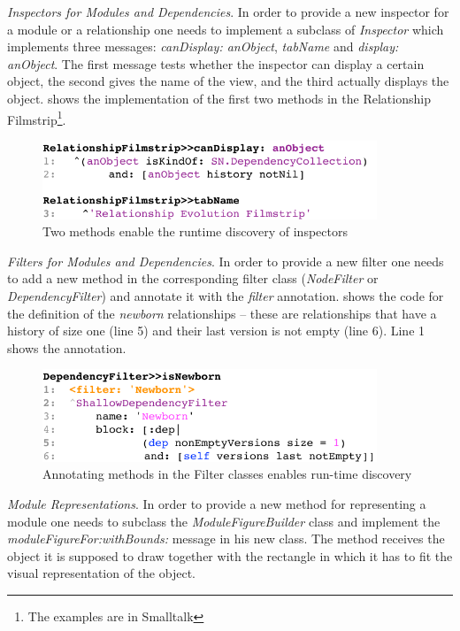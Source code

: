 \documentclass[preprint,12pt]{elsarticle}
\newcommand{\cd}[1]{{\em{#1}}}
\begin{document}
\begin{description}
\item {\em Inspectors for Modules and Dependencies}. In order to provide a new inspector for a module or a relationship one needs to implement a subclass of {\em Inspector} which implements three messages: \cd{canDisplay: anObject}, \cd{tabName} and \cd{display: anObject}. The first message tests whether the inspector can display a certain object, the second gives the name of the view, and the third actually displays the object.  shows the implementation of the first two methods in the Relationship Filmstrip\footnote{The examples are in Smalltalk}.

\begin{figure}[h]
\begin{center}
\includegraphics[width=10cm]{filmstrip-sample}
\caption{Two methods enable the runtime discovery of inspectors}
\end{center}
\end{figure}

\item {\em Filters for Modules and Dependencies}. In order to provide a new filter one needs to add a new method in the corresponding filter class (\cd{NodeFilter} or \cd{DependencyFilter}) and annotate it with the \cd{filter} annotation.  shows the code for the definition of the {\em newborn} relationships -- these are relationships that have a history of size one (line 5) and their last version is not empty (line 6). Line 1 shows the annotation.

\begin{figure}[h]
\begin{center}
\includegraphics[width=10cm]{filter-sample}
\caption{Annotating methods in the Filter classes enables run-time discovery}
\end{center}
\end{figure}


\item {\em Module Representations}. In order to provide a new method for representing a module one needs to subclass the \cd{ModuleFigureBuilder} class and implement the \cd{moduleFigureFor:withBounds:} message in his new class. The method receives the object it is supposed to draw together with the rectangle in which it has to fit the visual representation of the object.

\end{description} 
\end{document}

